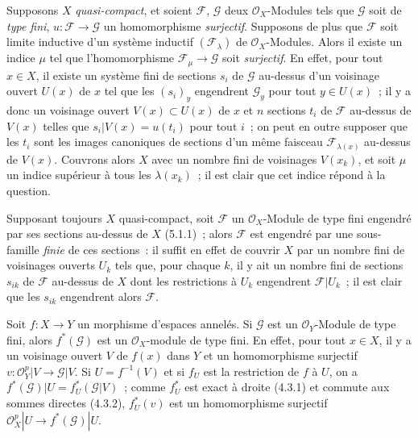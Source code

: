 \begin{env}[5.2.3]
\label{0.5.2.3-fr}
Supposons $X$ \emph{quasi-compact}, et soient $\mathcal{F}$, $\mathcal{G}$ deux
$\mathcal{O}_X$-Modules tels que $\mathcal{G}$ soit de \emph{type fini},
$u:\mathcal{F}\to\mathcal{G}$ un homomorphisme \emph{surjectif}. Supposons de
plus que $\mathcal{F}$ soit limite inductive d'un système inductif
$(\mathcal{F}_\lambda)$ de $\mathcal{O}_X$-Modules. Alors il existe un indice
$\mu$ tel que l'homomorphisme $\mathcal{F}_\mu\to\mathcal{G}$ soit
\emph{surjectif}. En effet, pour tout $x\in X$, il existe un système fini de
sections $s_i$ de $\mathcal{G}$ au-dessus d'un voisinage ouvert $U(x)$ de $x$
tel que les $(s_i)_y$ engendrent $\mathcal{G}_y$ pour tout $y\in U(x)$~; il y
a donc un voisinage ouvert $V(x)\subset U(x)$ de $x$ et $n$ sections $t_i$ de
$\mathcal{F}$ au-dessus de $V(x)$ telles que
$s_i|V(x)=u(t_i)$ pour tout $i$~; on peut en outre supposer que les $t_i$ sont
les images canoniques de sections d'un même faisceau
$\mathcal{F}_{\lambda(x)}$ au-dessus de $V(x)$. Couvrons alors $X$ avec un
nombre fini de voisinages $V(x_k)$, et soit $\mu$ un indice supérieur à tous
les $\lambda(x_k)$~; il est clair que cet indice répond à la question.

Supposant toujours $X$ quasi-compact, soit $\mathcal{F}$ un
$\mathcal{O}_X$-Module de type fini engendré par ses sections au-dessus de $X$
(5.1.1)~; alors $\mathcal{F}$ est engendré par une sous-famille \emph{finie}
de ces sections~: il suffit en effet de couvrir $X$ par un nombre fini de
voisinages ouverts $U_k$ tels que, pour chaque $k$, il y ait un nombre fini de
sections $s_{ik}$ de $\mathcal{F}$ au-dessus de $X$ dont les restrictions à
$U_k$ engendrent $\mathcal{F}|U_k$~; il est clair que les $s_{ik}$ engendrent
alors $\mathcal{F}$.
\end{env}

\begin{env}[5.2.4]
\label{0.5.2.4-fr}
Soit $f:X\to Y$ un morphisme d'espaces annelés. Si $\mathcal{G}$ est un
$\mathcal{O}_Y$-Module de type fini, alors $f^*(\mathcal{G})$ est un
$\mathcal{O}_X$-module de type fini. En effet, pour tout $x\in X$, il y a un
voisinage ouvert $V$ de $f(x)$ dans $Y$ et un homomorphisme surjectif
$v:\mathcal{O}_Y^p|V\to\mathcal{G}|V$. Si $U=f^{-1}(V)$ et si $f_U$ est la
restriction de $f$ à $U$, on a
$f^*(\mathcal{G})|U=f_U^*(\mathcal{G}|V)$~; comme $f_U^*$ est exact à droite
(4.3.1) et commute aux sommes directes (4.3.2), $f_U^*(v)$ est un
homomorphisme surjectif
$\mathcal{O}_X^p|U\to f^*(\mathcal{G})|U$.
\end{env}

